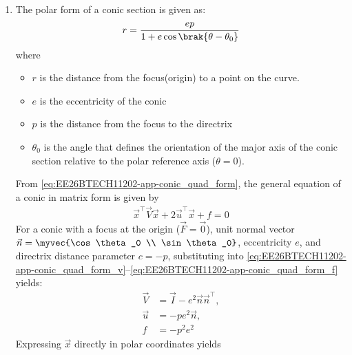 \begin{enumerate}[label=\thesubsection.\arabic*, ref=\thesubsection.\theenumi]
\begin{align}
\implies \|\vec{n}\|^2 \left(\vec{x}^\top \vec{x} - 2\vec{F}^\top \vec{x} + \|\vec{F}\|^2\right) &= e^2 \left(c^2 + \left(\vec{n}^\top \vec{x}\right)^2 - 2c\vec{n}^\top \vec{x}\right) 
\end{align}
\begin{align}
= e^2 \left(c^2 + \left(\vec{x}^\top \vec{n}\vec{n}^\top \vec{x}\right) - 2c\vec{n}^\top \vec{x}\right)
\end{align}
which can be expressed as \eqref{eq:EE26BTECH11202-app-conic_quad_form} after simplification.
\item The polar form of a conic section is given as: 
\begin{align}
	r = \frac{ep}{1 + e\cos\brak{\theta - \theta_0}} \label{eq:EE26BTECH11202-polar_conic}
\end{align}
where
\begin{itemize}
	\item $r$ is the distance from the focus(origin) to a point on the curve.
	\item $e$ is the eccentricity of the conic
	\item $p$ is the distance from the focus to the directrix
	\item $\theta _{0}$ is the angle that defines the orientation of the major axis of the conic section relative to the polar reference axis ($\theta = 0$).
\end{itemize}
\solution
From \eqref{eq:EE26BTECH11202-app-conic_quad_form}, the general equation of a conic in matrix form is given by
\begin{align}
    \vec{x}^{\top}\vec{V}\vec{x} + 2\vec{u}^{\top}\vec{x} + f = 0
    \label{eq:EE26BTECH11202-conic_matrix}
\end{align}
For a conic with a focus at the origin ($\vec{F} = \vec{0}$), unit normal vector $\vec{n} = \myvec{\cos\theta_0 \\ \sin\theta_0}$, eccentricity $e$, and directrix distance parameter $c = -p$, substituting into \eqref{eq:EE26BTECH11202-app-conic_quad_form_v}--\eqref{eq:EE26BTECH11202-app-conic_quad_form_f} yields:
\begin{align}
\vec{V} &= \vec{I} - e^2\vec{n}\vec{n}^{\top}, \label{eq:EE26BTECH11202-V_param} \\
\vec{u} &= -p e^2\vec{n}, \label{eq:EE26BTECH11202-u_param} \\
f &= -p^2 e^2 \label{eq:EE26BTECH11202-f_param}
\end{align}
Expressing $\vec{x}$ directly in polar coordinates yields
\begin{align}

\end{align}
\end{enumerate}
